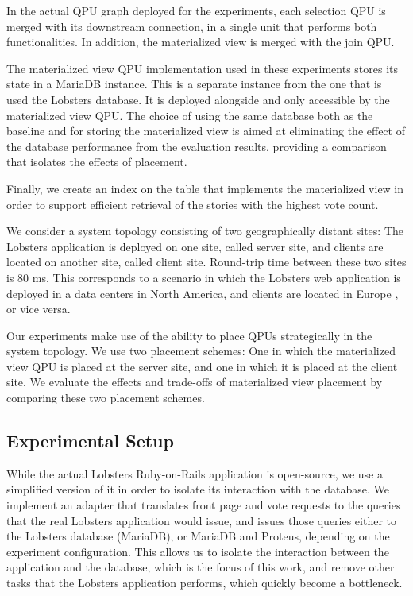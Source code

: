 In the actual QPU graph deployed for the experiments, each selection QPU is merged with its downstream connection,
in a single unit that performs both functionalities.
In addition, the materialized view is merged with the join QPU.

The materialized view QPU implementation used in these experiments stores its state in a MariaDB instance.
This is a separate instance from the one that is used the Lobsters database.
It is deployed alongside and only accessible by the materialized view QPU.
The choice of using the same database both as the baseline and for storing the materialized view is aimed at eliminating
the effect of the database performance from the evaluation results,
providing a comparison that isolates the effects of placement.

Finally, we create an index on the table that implements the materialized view in order to support efficient retrieval of
the stories with the highest vote count.

\bigskip
\noindent
We consider a system topology consisting of two geographically distant sites:
The Lobsters application is deployed on one site, called server site,
and clients are located on another site, called client site.
Round-trip time between these two sites is 80 ms.
This corresponds to a scenario in which the Lobsters web application is deployed in a data centers in North America,
and clients are located in Europe \cite{pbailis:hats}, or vice versa.

Our experiments  make use of the ability to place QPUs strategically in the system topology.
We use two placement schemes:
One in which the materialized view QPU is placed at the server site, and one in which it is placed at
the client site.
We evaluate the effects and trade-offs of materialized view placement by comparing these two placement schemes.


\subsection{Experimental Setup}
\label{sec:eval_setup}

While the actual Lobsters Ruby-on-Rails application is open-source,
we use a simplified version of it in order to isolate its interaction with the database.
We implement an adapter that translates front page and vote requests to the queries that the real
Lobsters application would issue, and issues those queries either to the Lobsters database (MariaDB),
or MariaDB and Proteus, depending on the experiment configuration.
This allows us to isolate the interaction between the application and the database, which is the focus of this work,
and remove other tasks that the Lobsters application performs, which quickly become a bottleneck.

